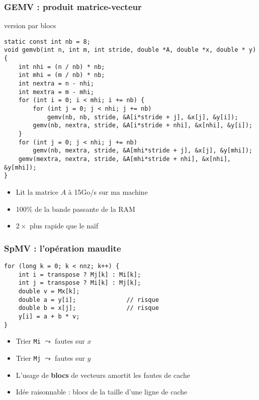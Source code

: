 \documentclass[xcolor={x11names,svgnames}]{beamer}
\newcommand{\red}[1]{{\color{red}#1}}
\begin{document}

\begin{frame}[fragile=singleslide]
  \frametitle{GEMV : produit matrice-vecteur}

\begin{alertblock}{version par blocs}
\begin{verbatim}
static const int nb = 8;
void gemvb(int n, int m, int stride, double *A, double *x, double * y)
{
    int nhi = (n / nb) * nb;
    int mhi = (m / nb) * nb;
    int nextra = n - nhi;
    int mextra = m - mhi;
    for (int i = 0; i < mhi; i += nb) {
        for (int j = 0; j < nhi; j += nb)
            gemv(nb, nb, stride, &A[i*stride + j], &x[j], &y[i]);
        gemv(nb, nextra, stride, &A[i*stride + nhi], &x[nhi], &y[i]);
    }
    for (int j = 0; j < nhi; j += nb)
        gemv(nb, mextra, stride, &A[mhi*stride + j], &x[j], &y[mhi]);
    gemv(mextra, nextra, stride, &A[mhi*stride + nhi], &x[nhi], &y[mhi]);
}
\end{verbatim}
    \begin{itemize}
    \item Lit la matrice $A$ à 15Go/s sur ma machine
    \item 100\% de la bande passante de la RAM
    \item $2\times$ plus rapide que le naïf
    \end{itemize}

\end{alertblock}
\end{frame}


\begin{frame}[fragile]
  \frametitle{SpMV : l'opération maudite}

\begin{verbatim}
for (long k = 0; k < nnz; k++) {
    int i = transpose ? Mj[k] : Mi[k];
    int j = transpose ? Mi[k] : Mj[k];
    double v = Mx[k];
    double a = y[i];              // risque
    double b = x[j];              // risque
    y[i] = a + b * v;
}
\end{verbatim}

  \begin{itemize}
  \item Trier \texttt{Mi} $\leadsto$ fautes sur $x$
  \item Trier \texttt{Mj} $\leadsto$ fautes sur $y$    
  \item L'usage de \textbf{blocs} de vecteurs \red{amortit} les fautes de cache
  \item Idée \og raisonnable\fg{} : blocs de la taille d'une ligne de cache
  \end{itemize}
\end{frame}
\end{document}

